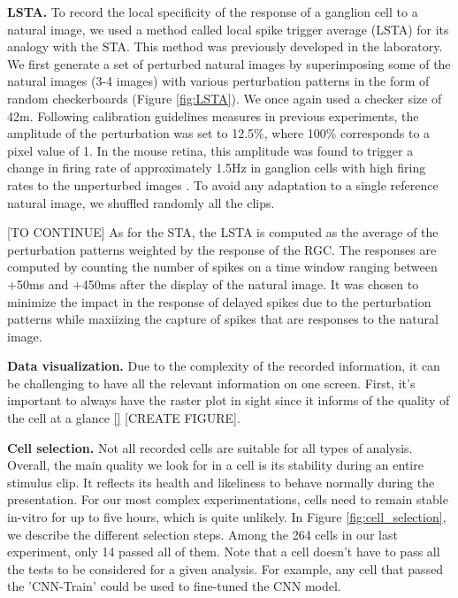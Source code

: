 \textbf{LSTA.}
To record the local specificity of the response of a ganglion cell to a natural
image, we used a method called local spike trigger average (LSTA) for its
analogy with the STA. This method was previously developed in the laboratory.
We first generate a set of perturbed natural images by superimposing some of
the natural images (3-4 images) with various perturbation patterns in the form
of random checkerboards (Figure \ref{fig:LSTA}). We once again used a checker
size of 42\textmu m.
Following calibration guidelines measures in previous experiments, the
amplitude of the perturbation was set to 12.5\%, where 100\% corresponds to a
pixel value of 1. In the mouse retina, this amplitude was found to trigger a
change in firing rate of approximately 1.5Hz in ganglion cells with high firing
rates to the unperturbed images \citep{goldin_context-dependent_2022}. To avoid any adaptation to a single reference natural image, we shuffled randomly all the clips.

[TO CONTINUE]
As for the STA, the LSTA is computed as the average of the perturbation patterns weighted by the response of the RGC. The responses are computed by counting the number of spikes on a time window ranging between +50ms and +450ms after the display of the natural image. It was chosen to minimize the impact in the response of delayed spikes due to the perturbation patterns while maxiizing the capture of spikes that are responses to the natural image.

\textbf{Data visualization.}
Due to the complexity of the recorded information, it can be challenging to
have
all the relevant information on one screen. First, it's important to always
have the raster plot in sight since it informs of the quality of the cell at a
glance \ref{} [CREATE FIGURE].



\textbf{Cell selection.}
Not all recorded cells are suitable for all types of analysis. Overall, the
main quality we look for in a cell is its stability during an entire stimulus
clip.
It reflects its health and likeliness to behave normally during the
presentation. For our most complex experimentations, cells need to remain
stable in-vitro for up to five hours, which is quite unlikely. In Figure
\ref{fig:cell_selection}, we
describe the different selection steps. Among the 264 cells
in our last experiment, only 14 passed all of them. Note that a cell doesn't have to
pass all the tests to be considered for a given analysis. For example, any cell
that passed the 'CNN-Train' could be used to fine-tuned the CNN model.

